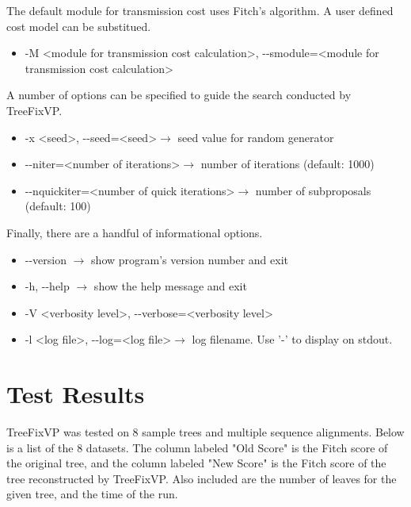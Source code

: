 \documentclass[12pt]{article}
\begin{document}
The default module for transmission cost uses Fitch's algorithm. A user defined cost model can
be substitued.

\begin{itemize}
    \item -M \textless module for transmission cost calculation\textgreater, -{}-smodule=\textless module for transmission cost calculation\textgreater
\end{itemize}

A number of options can be specified to guide the search conducted by TreeFixVP.

\begin{itemize}
    \item -x \textless seed\textgreater, -{}-seed=\textless seed\textgreater $\rightarrow$ seed value for random generator
    \item -{}-niter=\textless number of iterations\textgreater $\rightarrow$ number of iterations (default: 1000)
    \item -{}-nquickiter=\textless number of quick iterations\textgreater $\rightarrow$ number of subproposals (default: 100)
\end{itemize}

Finally, there are a handful of informational options.

\begin{itemize}
    \item -{}-version $\rightarrow$ show program's version number and exit
    \item -h, -{}-help $\rightarrow$ show the help message and exit
    \item -V \textless verbosity level\textgreater, -{}-verbose=\textless verbosity level\textgreater
    \item -l \textless log file\textgreater, -{}-log=\textless log file\textgreater $\rightarrow$ log filename.  Use '-' to display on stdout.
\end{itemize}

\section{Test Results}
TreeFixVP was tested on 8 sample trees and multiple sequence alignments. Below is a list of
the 8 datasets. The column labeled "Old Score" is the Fitch score of the original tree, and the column
labeled "New Score" is the Fitch score of the tree reconstructed by TreeFixVP. Also included are the number
of leaves for the given tree, and the time of the run.
\end{document}
